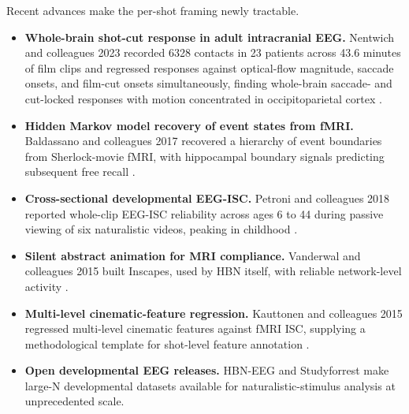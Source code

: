 \documentclass[preprint,12pt]{elsarticle}
\begin{document}
\begin{tcolorbox}[colback=blue!5!white,colframe=blue!40,title=Trends Box: recent developments enabling the per-shot framing,breakable]
Recent advances make the per-shot framing newly tractable.

\begin{itemize}
  \item \textbf{Whole-brain shot-cut response in adult intracranial EEG.} Nentwich and colleagues 2023 recorded 6328 contacts in 23 patients across 43.6 minutes of film clips and regressed responses against optical-flow magnitude, saccade onsets, and film-cut onsets simultaneously, finding whole-brain saccade- and cut-locked responses with motion concentrated in occipitoparietal cortex \cite{Nentwich2023SemanticNM}.
  \item \textbf{Hidden Markov model recovery of event states from fMRI.} Baldassano and colleagues 2017 recovered a hierarchy of event boundaries from Sherlock-movie fMRI, with hippocampal boundary signals predicting subsequent free recall \cite{baldassano2017event}.
  \item \textbf{Cross-sectional developmental EEG-ISC.} Petroni and colleagues 2018 reported whole-clip EEG-ISC reliability across ages 6 to 44 during passive viewing of six naturalistic videos, peaking in childhood \cite{Petroni2018TheVO}.
  \item \textbf{Silent abstract animation for MRI compliance.} Vanderwal and colleagues 2015 built Inscapes, used by HBN itself, with reliable network-level activity \cite{Vanderwal2015InscapesAM}.
  \item \textbf{Multi-level cinematic-feature regression.} Kauttonen and colleagues 2015 regressed multi-level cinematic features against fMRI ISC, supplying a methodological template for shot-level feature annotation \cite{Kauttonen2015OptimizingMF}.
  \item \textbf{Open developmental EEG releases.} HBN-EEG and Studyforrest \cite{Hanke2014AH7} make large-N developmental datasets available for naturalistic-stimulus analysis at unprecedented scale.
\end{itemize}
\end{tcolorbox}
\end{document}
